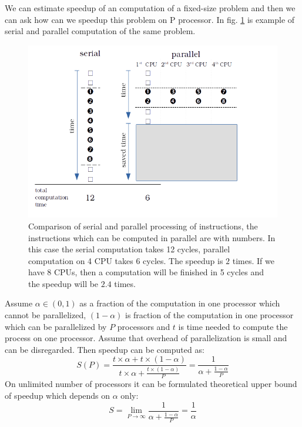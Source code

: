 We can estimate speedup of an computation of a fixed-size problem and then we can ask how can we speedup this problem on P processor. In fig. \ref{fig:serialvsparallel} is example of serial and parallel computation of the same problem.

\begin{figure}[ht]
    \centering
    \includegraphics[width=1\textwidth]{serialvsparallel.png}
    \caption{Comparison of serial and parallel processing of instructions, the instructions which can be computed in parallel are with numbers. In this case the serial computation takes 12 cycles, parallel computation on 4 CPU takes 6 cycles. The speedup is $2$ times. If we have 8 CPUs, then a computation will be finished in 5 cycles and the speedup will be $2.4$ times.}
    \label{fig:serialvsparallel}
\end{figure}

Assume  $\alpha \in (0,1)$ as a fraction of the computation in one processor which cannot be parallelized, $(1-\alpha)$ is fraction of the computation in one processor which can be parallelized by $P$ processors and $t$ is time needed to compute the process on one processor. Assume that overhead of parallelization is small and can be disregarded. Then speedup can be computed as:
\begin{equation}\label{eq:speedup2}
 S(P) = \frac{t\times\alpha+t\times(1-\alpha)}{t \times \alpha + \frac{t \times (1-\alpha)}{P} } = \frac{1}{\alpha +\frac{1-\alpha}{P}}
 \end{equation}
On unlimited number of processors it can be formulated theoretical upper bound of speedup which depends on $\alpha$ only:
\begin{equation} \label{eq:amdahl}
S = \lim_{P \to \infty} \frac{1}{\alpha +\frac{1-\alpha}{P}} = \frac{1}{\alpha}
\end{equation}

